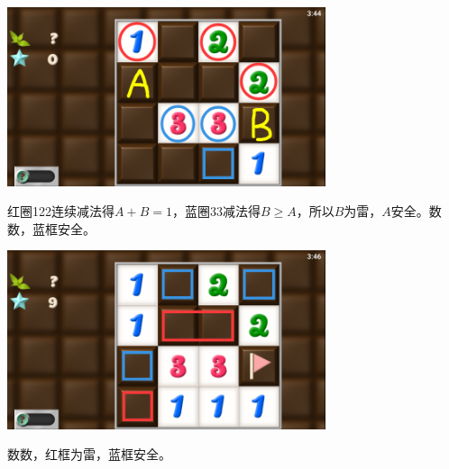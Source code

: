 \subsection{} %
\begin{center}
    \includegraphics[width=0.7\textwidth]{puzzle/161-1.png}
\end{center}
红圈122连续减法得$A+B=1$，蓝圈33减法得$B\ge A$，所以$B$为雷，$A$安全。数数，蓝框安全。
\begin{center}
    \includegraphics[width=0.7\textwidth]{puzzle/161-2.png}
\end{center}
数数，红框为雷，蓝框安全。

